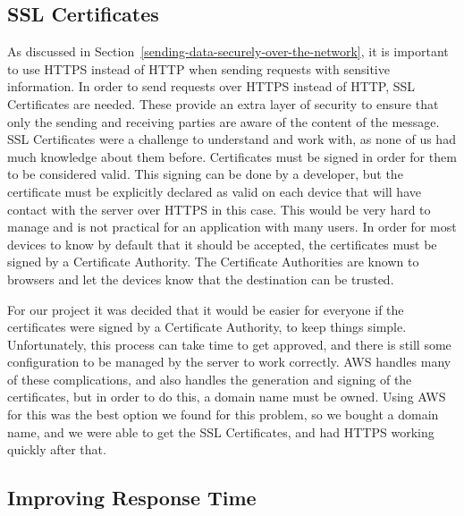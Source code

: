 \documentclass[12pt]{report}
\let\Oldsubsection\subsection
\renewcommand{\subsection}{\FloatBarrier\Oldsubsection}
\begin{document}
\subsection{SSL Certificates} \label{ssl-certificates}

As discussed in Section~\ref{sending-data-securely-over-the-network}, it is important to use HTTPS
instead of HTTP when sending requests with sensitive information.
In order to send requests over HTTPS instead of HTTP, SSL Certificates are needed.
These provide an extra layer of security to ensure that only the sending and receiving parties are
aware of the content of the message.
SSL Certificates were a challenge to understand and work with, as none of us had much
knowledge about them before. Certificates must be signed in order for them to be considered
valid. This signing can be done by a developer, but the certificate must be explicitly declared as
valid on each device that will have contact with the server over HTTPS in this case. This would
be very hard to manage and is not practical for an application with many users. In order for most
devices to know by default that it should be accepted, the certificates must be signed by a
Certificate Authority. The Certificate Authorities are known to browsers and let the devices know
that the destination can be trusted.

For our project it was decided that it would be easier for everyone if the certificates were
signed by a Certificate Authority, to keep things simple. Unfortunately, this process can take
time to get approved, and there is still some configuration to be managed by the server to work
correctly. AWS handles many of these complications, and also handles the generation and
signing of the certificates, but in order to do this, a domain name must be owned. Using AWS for
this was the best option we found for this problem, so we bought a domain name, and we were
able to get the SSL Certificates, and had HTTPS working quickly after that.


\subsection{Improving Response Time} \label{improving-response-time}
\end{document}
